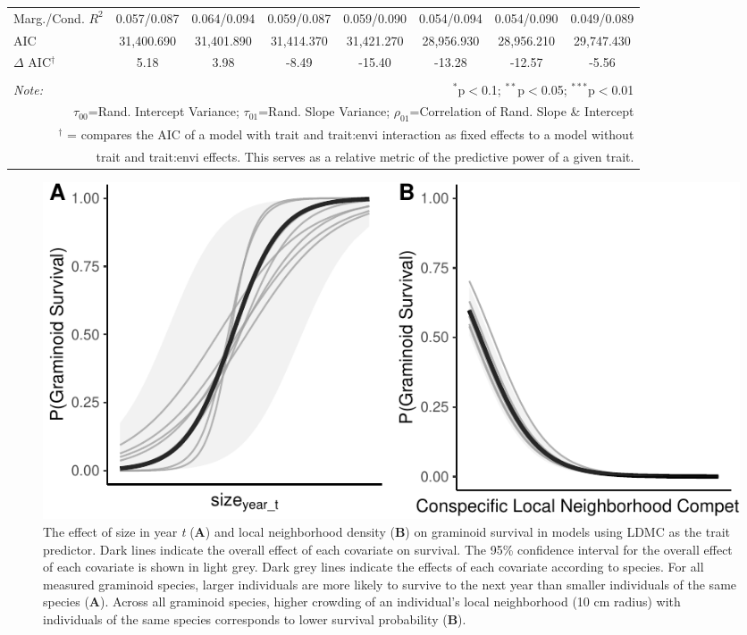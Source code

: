 \documentclass[12pt, letterpaper]{article}
\begin{document}
\begin{table}[h]
{\begin{tabular}{lccccccc}
 Marg./Cond. $R^2$ & 0.057/0.087 &	0.064/0.094&	0.059/0.087	&0.059/0.090&	0.054/0.094	& 0.054/0.090 &	0.049/0.089 \\
\rowcolor[gray]{.95} AIC & 31,400.690 & 31,401.890 & 31,414.370 & 31,421.270 & 28,956.930 & 28,956.210 & 29,747.430  \\  
\hline 
$\Delta$ AIC$^\dagger$  & 5.18 & 3.98 & -8.49 & -15.40 & -13.28 & -12.57 & -5.56 \\
\hline 
\hline \\[-1.8ex] 
\textit{Note:}  & \multicolumn{7}{r}{$^{*}$p$<$0.1; $^{**}$p$<$0.05; $^{***}$p$<$0.01} \\ 
\multicolumn{8}{r}{$\tau_{00}$=Rand. Intercept Variance; $\tau_{01}$=Rand. Slope Variance; $\rho_{01}$=Correlation of Rand. Slope \& Intercept}\\ 
\multicolumn{8}{r}{$^\dagger$ = compares the AIC of a model with trait and trait:envi interaction as fixed effects to a model without}\\
\multicolumn{8}{r}{trait and trait:envi effects. This serves as a relative metric of the predictive power of a given trait.}
\end{tabular}}
\end{table} 

\begin{figure}
    \centering
    \includegraphics[width=.9\textwidth]{figures/survEffectPlots-1.pdf}
    \caption{The effect of size in year \textit{t} (\textbf{A}) and local neighborhood density (\textbf{B}) on graminoid survival in models using LDMC as the trait predictor. Dark lines indicate the overall effect of each covariate on survival. The 95\% confidence interval for the overall effect of each covariate is shown in light grey. Dark grey lines indicate the effects of each covariate according to species. For all measured graminoid species, larger individuals are more likely to survive to the next year than smaller individuals of the same species (\textbf{A}). Across all graminoid species, higher crowding of an individual's local neighborhood (10 cm radius) with individuals of the same species corresponds to lower survival probability (\textbf{B}). }
    \label{fig:Effects_Survival}
\end{figure}
\end{document}
